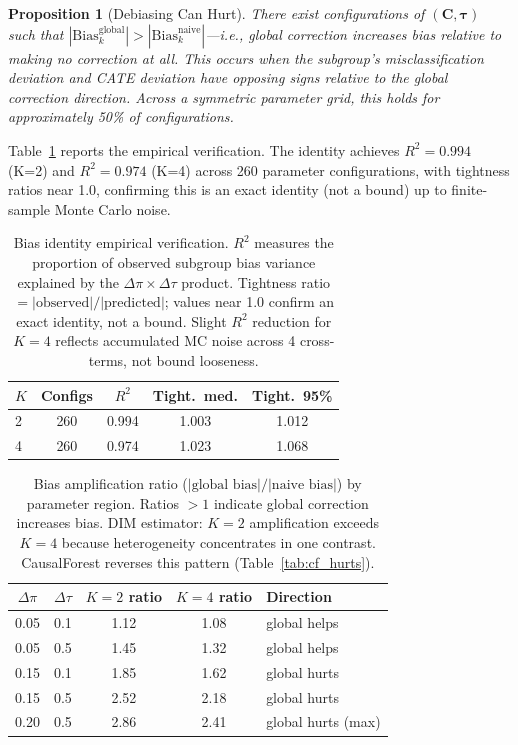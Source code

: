 \documentclass[11pt]{article}
\newtheorem{proposition}{Proposition}
\newcommand{\cate}{\tau}
\newcommand{\bC}{\mathbf{C}}
\newcommand{\dpi}{\Delta\pi}
\newcommand{\dtau}{\Delta\tau}
\begin{document}
\begin{proposition}[Debiasing Can Hurt]
\label{prop:hurts}
There exist configurations of $(\bC, \boldsymbol{\cate})$ such that $|\mathrm{Bias}_k^{\mathrm{global}}| > |\mathrm{Bias}_k^{\mathrm{naive}}|$---i.e., global correction \emph{increases} bias relative to making no correction at all.
This occurs when the subgroup's misclassification deviation and CATE deviation have opposing signs relative to the global correction direction.
Across a symmetric parameter grid, this holds for approximately 50\% of configurations.
\end{proposition}

Table~\ref{tab:bias_verify} reports the empirical verification.
The identity achieves $R^2 = 0.994$ (K=2) and $R^2 = 0.974$ (K=4) across 260 parameter configurations, with tightness ratios near 1.0, confirming this is an exact identity (not a bound) up to finite-sample Monte Carlo noise.

\begin{table}[t]
\centering
\small
\begin{tabular}{lcccc}
\toprule
$K$ & Configs & $R^2$ & Tight.\ med. & Tight.\ 95\% \\
\midrule
2 & 260 & 0.994 & 1.003 & 1.012 \\
4 & 260 & 0.974 & 1.023 & 1.068 \\
\bottomrule
\end{tabular}
\caption{Bias identity empirical verification. $R^2$ measures the proportion of observed subgroup bias variance explained by the $\dpi \times \dtau$ product. Tightness ratio $= |\text{observed}|/|\text{predicted}|$; values near 1.0 confirm an exact identity, not a bound. Slight $R^2$ reduction for $K{=}4$ reflects accumulated MC noise across 4 cross-terms, not bound looseness.}
\label{tab:bias_verify}
\end{table}

\begin{table}[t]
\centering
\small
\begin{tabular}{ccccl}
\toprule
$\dpi$ & $\dtau$ & $K{=}2$ ratio & $K{=}4$ ratio & Direction \\
\midrule
0.05 & 0.1 & 1.12 & 1.08 & global helps \\
0.05 & 0.5 & 1.45 & 1.32 & global helps \\
0.15 & 0.1 & 1.85 & 1.62 & global hurts \\
0.15 & 0.5 & 2.52 & 2.18 & global hurts \\
0.20 & 0.5 & 2.86 & 2.41 & global hurts (max) \\
\bottomrule
\end{tabular}
\caption{Bias amplification ratio ($|\text{global bias}|/|\text{naive bias}|$) by parameter region. Ratios $> 1$ indicate global correction increases bias. DIM estimator: $K{=}2$ amplification exceeds $K{=}4$ because heterogeneity concentrates in one contrast. CausalForest reverses this pattern (Table~\ref{tab:cf_hurts}).}
\label{tab:amplification}
\end{table}
\end{document}
